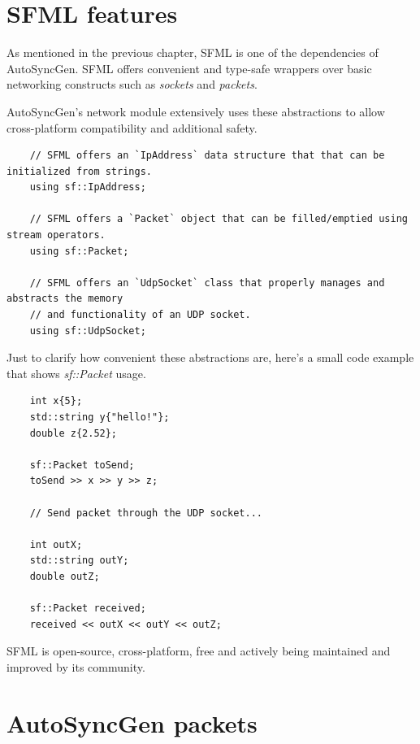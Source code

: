 \documentclass{report}
\begin{document}
        \section{SFML features}
            As mentioned in the previous chapter, SFML is one of the dependencies of AutoSyncGen. 
            SFML offers convenient and type-safe wrappers over basic networking constructs such as \emph{sockets} and \emph{packets}.

            AutoSyncGen's network module extensively uses these abstractions to allow cross-platform compatibility and additional safety.

            \begin{verbatim}
    // SFML offers an `IpAddress` data structure that that can be initialized from strings.
    using sf::IpAddress;
    
    // SFML offers a `Packet` object that can be filled/emptied using stream operators.
    using sf::Packet;

    // SFML offers an `UdpSocket` class that properly manages and abstracts the memory 
    // and functionality of an UDP socket.
    using sf::UdpSocket;
            \end{verbatim}

            Just to clarify how convenient these abstractions are, here's a small code example that shows \emph{sf::Packet} usage.

            \begin{verbatim}
    int x{5};
    std::string y{"hello!"};
    double z{2.52};

    sf::Packet toSend;
    toSend >> x >> y >> z;

    // Send packet through the UDP socket...

    int outX; 
    std::string outY;
    double outZ;
    
    sf::Packet received;
    received << outX << outY << outZ;
            \end{verbatim}

            SFML is open-source, cross-platform, free and actively being maintained and improved by its community.

        \section{AutoSyncGen packets}
            
\end{document}
